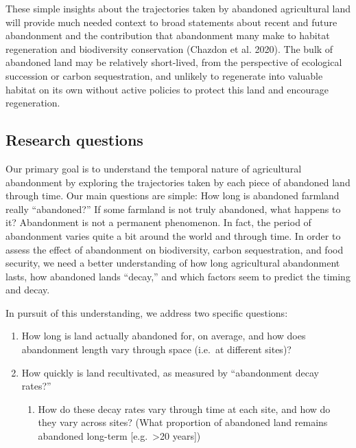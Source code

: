 \documentclass[
]{article}
\providecommand{\tightlist}{%
  \setlength{\itemsep}{0pt}\setlength{\parskip}{0pt}}
\begin{document}
These simple insights about the trajectories taken by abandoned agricultural land will provide much needed context to broad statements about recent and future abandonment and the contribution that abandonment many make to habitat regeneration and biodiversity conservation (Chazdon et al. 2020).
The bulk of abandoned land may be relatively short-lived, from the perspective of ecological succession or carbon sequestration, and unlikely to regenerate into valuable habitat on its own without active policies to protect this land and encourage regeneration.

\hypertarget{research-questions}{%
\subsection{Research questions}\label{research-questions}}

Our primary goal is to understand the temporal nature of agricultural abandonment by exploring the trajectories taken by each piece of abandoned land through time.
Our main questions are simple: How long is abandoned farmland really ``abandoned?'' If some farmland is not truly abandoned, what happens to it?
Abandonment is not a permanent phenomenon.
In fact, the period of abandonment varies quite a bit around the world and through time.
In order to assess the effect of abandonment on biodiversity, carbon sequestration, and food security, we need a better understanding of how long agricultural abandonment lasts, how abandoned lands ``decay,'' and which factors seem to predict the timing and decay.

In pursuit of this understanding, we address two specific questions:

\begin{enumerate}
\def\labelenumi{\arabic{enumi}.}
\tightlist
\item
  How long is land actually abandoned for, on average, and how does abandonment length vary through space (i.e.~at different sites)?
\item
  How quickly is land recultivated, as measured by ``abandonment decay rates?''

  \begin{enumerate}
  \def\labelenumii{\alph{enumii}.}
  \tightlist
  \item
    How do these decay rates vary through time at each site, and how do they vary across sites? (What proportion of abandoned land remains abandoned long-term {[}e.g.~\textgreater20 years{]})
  \end{enumerate}
\end{enumerate}
\end{document}
